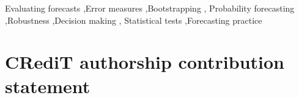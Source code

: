 \documentclass[11pt,3p,review,authoryear]{elsarticle}
\theoremstyle{definition}
\begin{document}
\begin{frontmatter}
\begin{keyword}
Evaluating forecasts \sep Error measures \sep Bootstrapping \sep
Probability forecasting \sep Robustness \sep Decision making \sep
Statistical tests \sep Forecasting practice
\end{keyword}

\end{frontmatter}

\section*{CRediT authorship contribution statement}
\end{document}
